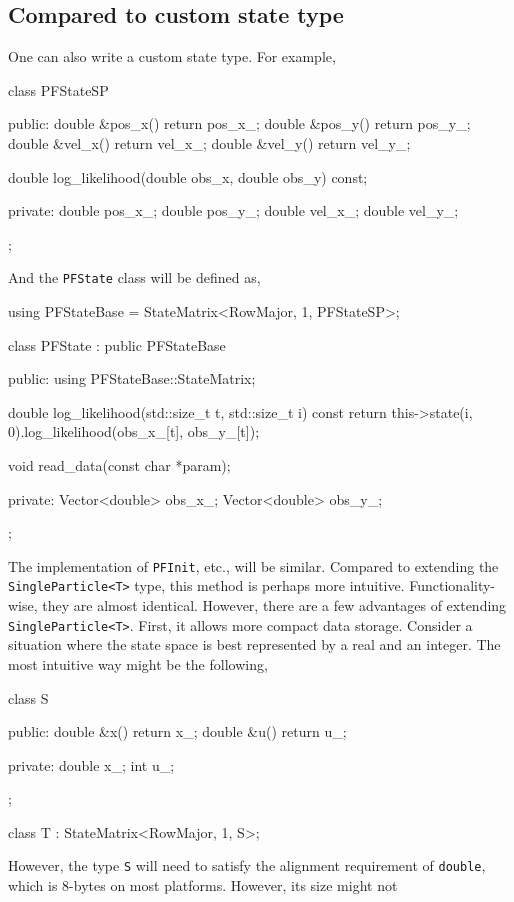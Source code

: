 \subsection{Compared to custom state type}
\label{sub:Compared to custom state type}

One can also write a custom state type. For example,
\begin{cppcode}
  class PFStateSP
  {
      public:
      double &pos_x() { return pos_x_; }
      double &pos_y() { return pos_y_; }
      double &vel_x() { return vel_x_; }
      double &vel_y() { return vel_y_; }

      double log_likelihood(double obs_x, double obs_y) const;

      private:
      double pos_x_;
      double pos_y_;
      double vel_x_;
      double vel_y_;
  };
\end{cppcode}
And the \verb|PFState| class will be defined as,
\begin{cppcode}
  using PFStateBase = StateMatrix<RowMajor, 1, PFStateSP>;

  class PFState : public PFStateBase
  {
      public:
      using PFStateBase::StateMatrix;

      double log_likelihood(std::size_t t, std::size_t i) const
      {
          return this->state(i, 0).log_likelihood(obs_x_[t], obs_y_[t]);
      }

      void read_data(const char *param);

      private:
      Vector<double> obs_x_;
      Vector<double> obs_y_;
  };
\end{cppcode}
The implementation of \verb|PFInit|, etc., will be similar. Compared to
extending the \verb|SingleParticle<T>| type, this method is perhaps more
intuitive. Functionality-wise, they are almost identical. However, there are a
few advantages of extending \verb|SingleParticle<T>|. First, it allows more
compact data storage. Consider a situation where the state space is best
represented by a real and an integer. The most intuitive way might be the
following,
\begin{cppcode}
  class S
  {
      public:
      double &x() { return x_; }
      double &u() { return u_; }

      private:
      double x_;
      int u_;
  };

  class T : StateMatrix<RowMajor, 1, S>;
\end{cppcode}
However, the type \verb|S| will need to satisfy the alignment requirement of
\verb|double|, which is 8-bytes on most platforms. However, its size might not
